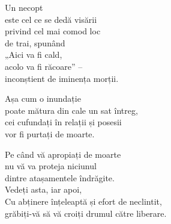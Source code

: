 Un necopt\\
este cel ce se dedă visării\\
privind cel mai comod loc\\
de trai, spunând\\
„Aici va fi cald,\\
acolo va fi răcoare” –\\
inconștient de iminența morții.


Așa cum o inundație\\
poate mătura din cale un sat întreg,\\
cei cufundați în relații și posesii\\
vor fi purtați de moarte.


Pe când vă apropiați de moarte\\
nu vă va proteja niciunul\\
dintre atașamentele îndrăgite.\\
Vedeți asta, iar apoi,\\
Cu abținere înțeleaptă și efort de neclintit,\\
grăbiți-vă să vă croiți drumul către liberare.
